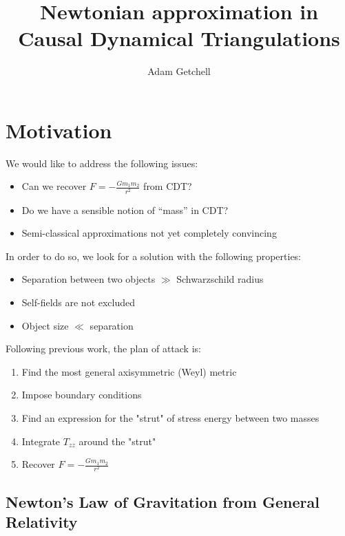 \documentclass{article}
\title{Newtonian approximation in Causal Dynamical Triangulations}
\author{Adam Getchell}
\date{}
\begin{document}
\maketitle
\tableofcontents

\section{Motivation}

We would like to address the following issues:

\begin{itemize}
\item Can we recover $F=-\frac{Gm_{1}m_{2}}{r^{2}}$ from CDT?
\item Do we have a sensible notion of \textquotedblleft{}mass\textquotedblright{}
in CDT?
\item Semi-classical approximations not yet completely convincing \cite{trzesniewski2011analysis}
\end{itemize}

In order to do so, we look for a solution with the following properties:

\begin{itemize}
\item Separation between two objects $\gg$ Schwarzschild radius

\item Self-fields are not excluded

\item Object size $\ll$ separation

\end{itemize}

Following previous work\cite{katz1967derivation}, the plan of attack is:

\begin{enumerate}
\item Find the most general axisymmetric (Weyl) metric
\item Impose boundary conditions
\item Find an expression for the "strut" of stress energy between two masses
\item Integrate $T_{zz}$ around the "strut"
\item Recover $F=-\frac{Gm_{1}m_{2}}{r^{2}}$ 
\end{enumerate}

\subsection{Newton's Law of Gravitation from General Relativity}
\end{document}
